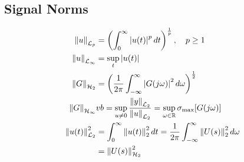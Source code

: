 \subsection{Signal Norms}
\vspace*{-1em}
\begin{align*}
    \left\| u \right\|_{\mathcal{L}_p} &= \left(\int_{0}^{\infty} \left\lvert u(t) \right\rvert^p dt \right)^{\frac{1}{p}}, \quad p \geq 1\\
    \left\| u \right\|_{\mathcal{L}_\infty} &= \sup_{t} \left\lvert u(t) \right\rvert\\
    \left\| G \right\|_{\mathcal{H}_2} &= \left(\frac{1}{2\pi}\int_{-\infty}^{\infty} \left\lvert G(j\omega) \right\rvert^2 d\omega \right)^{\frac{1}{2}}\\
    \left\| G \right\|_{\mathcal{H}_\infty} &vb= \sup_{u \neq 0} \frac{\left\| y \right\|_{\mathcal{L}_2}}{\left\| u \right\|_{\mathcal{L}_2}} 
    = \sup_{\omega \in \mathbb{R}} \sigma_{\max}[G(j\omega)]\\
    \left\| u(t) \right\|^2_{\mathcal{L}_2} &= \int_{0}^{\infty} \left\| u(t) \right\|^2_2 dt = \frac{1}{2\pi} \int_{-\infty}^{\infty} \left\| U(s) \right\|^2_2 d\omega\\
    &= \left\| U(s) \right\|^2_{\mathcal{H}_2}
\end{align*}